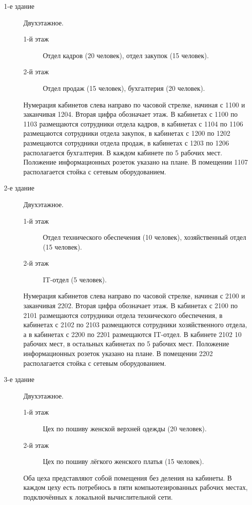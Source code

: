 \begin{description}
\item [1-е здание]
  Двухэтажное.
  \begin{description} 
  \item[1-й этаж]
    Отдел кадров (20 человек), отдел закупок (15 человек).
  \item[2-й этаж]
    Отдел продаж (15 человек), бухгалтерия (20 человек).
  \end{description}
  Нумерация кабинетов слева направо по часовой стрелке, начиная с 1100 и заканчивая 1204. Вторая цифра обозначает этаж. В кабинетах с 1100 по 1103 размещаются сотрудники отдела кадров, в кабинетах с 1104 по 1106 размещаются сотрудники отдела закупок, в кабинетах с 1200 по 1202 размещаются сотрудники отдела продаж, в кабинетах с 1203 по 1206 располагается бухгалтерия. В каждом кабинете по 5 рабочих мест. Положение информационных розеток указано на плане. В помещении 1107 располагается стойка с сетевым оборудованием.
\item [2-е здание]
  Двухэтажное.
  \begin{description}
  \item [1-й этаж]
    Отдел технического обеспечения (10 человек), хозяйственный отдел (15 человек).
  \item[2-й этаж]
    IT-отдел (5 человек).
  \end{description}
  Нумерация кабинетов слева направо по часовой стрелке, начиная с 2100 и заканчивая 2202. Вторая цифра обозначает этаж. В кабинетах с 2100 по 2101 размещаются сотрудники отдела технического обеспечения, в кабинетах с 2102 по 2103 размещаются сотрудники хозяйственного отдела, а в кабинетах с 2200 по 2201 размещаются IT-отдел.
  В кабинете 2102 10 рабочих мест, в остальных кабинетах по 5 рабочих мест. Положение информационных розеток указано на плане. В помещении 2202 располагается стойка с сетевым оборудованием.
\item [3-е здание]
  Двухэтажное.
  \begin{description} 
  \item[1-й этаж]
    Цех по пошиву женской верхней одежды (20 человек).
  \item[2-й этаж]
    Цех по пошиву лёгкого женского платья (15 человек).
  \end{description}
  Оба цеха представляют собой помещения без деления на кабинеты. В каждом цеху есть потребнось в пяти компьютезированных рабочих местах, подключённых к  локальной вычислительной сети.
  

\end{description}
